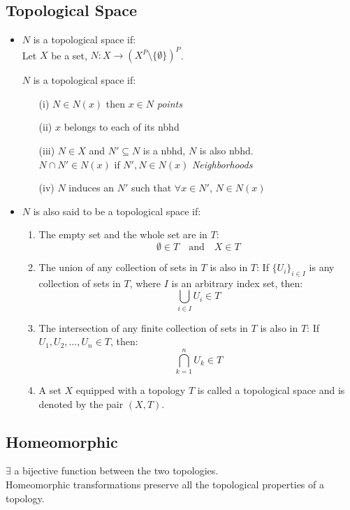 \documentclass[a4paper]{article}
\begin{document}
\subsection{Topological Space}
\begin{itemize}
    \item $N$ is a topological space if: \\
    Let $X$ be a set, $N: X \to (X^P \setminus \{\emptyset\})^P$.

    $N$ is a topological space if:
    \begin{itemize}
        \item[(i)] $N \in N(x)$ then $x \in N$ \hfill \textit{points}
        \item[(ii)] $x$ belongs to each of its nbhd
        \item[(iii)] $N \in X$ and $N' \subseteq N$ is a nbhd, $N$ is also nbhd. \\
        $N \cap N' \in N(x)$ if $N', N \in N(x)$ \hfill \textit{Neighborhoods}
        \item[(iv)] $N$ induces an $N'$ such that $\forall x \in N'$, $N \in N(x)$
    \end{itemize}
    \item $N$ is also said to be a topological space if:
     \begin{enumerate}
        \item The empty set and the whole set are in $T$:
        \[
        \emptyset \in T \quad \text{and} \quad X \in T
        \]
        
        \item The union of any collection of sets in $T$ is also in $T$:
        If $\{U_i\}_{i \in I}$ is any collection of sets in $T$, where $I$ is an arbitrary index set, then:
        \[
        \bigcup_{i \in I} U_i \in T
        \]
        
        \item The intersection of any finite collection of sets in $T$ is also in $T$:
        If $U_1, U_2, \ldots, U_n \in T$, then:
        \[
        \bigcap_{k=1}^n U_k \in T
        \]
        
        \item A set $X$ equipped with a topology $T$ is called a topological space and is denoted by the pair $(X, T)$.
    \end{enumerate}
\end{itemize}


\subsection{Homeomorphic}
$\exists$ a bijective function between the two topologies. \\
Homeomorphic transformations preserve all the topological properties of a topology.
\end{document}
